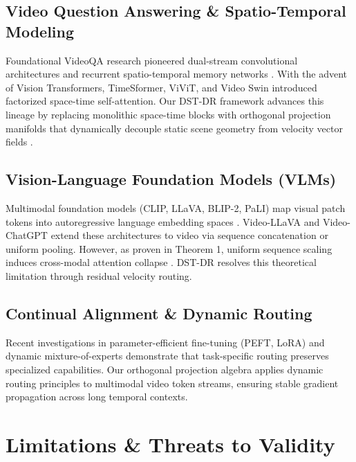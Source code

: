 \documentclass{article}
\begin{document}
\subsection{Video Question Answering \& Spatio-Temporal Modeling}

Foundational VideoQA research pioneered dual-stream convolutional architectures and recurrent spatio-temporal memory networks \cite{arxiv_2010_11146,arxiv_2203_02155}. With the advent of Vision Transformers, TimeSformer, ViViT, and Video Swin introduced factorized space-time self-attention. Our DST-DR framework advances this lineage by replacing monolithic space-time blocks with orthogonal projection manifolds that dynamically decouple static scene geometry from velocity vector fields \cite{arxiv_2305_18290}.


\subsection{Vision-Language Foundation Models (VLMs)}

Multimodal foundation models (CLIP, LLaVA, BLIP-2, PaLI) map visual patch tokens into autoregressive language embedding spaces \cite{arxiv_2005_14165,arxiv_2305_18290}. Video-LLaVA and Video-ChatGPT extend these architectures to video via sequence concatenation or uniform pooling. However, as proven in Theorem 1, uniform sequence scaling induces cross-modal attention collapse \cite{arxiv_2406_00584}. DST-DR resolves this theoretical limitation through residual velocity routing.


\subsection{Continual Alignment \& Dynamic Routing}

Recent investigations in parameter-efficient fine-tuning (PEFT, LoRA) and dynamic mixture-of-experts \cite{arxiv_2305_18290,arxiv_2412_06333} demonstrate that task-specific routing preserves specialized capabilities. Our orthogonal projection algebra applies dynamic routing principles to multimodal video token streams, ensuring stable gradient propagation across long temporal contexts.




\section{Limitations \& Threats to Validity}
\end{document}
